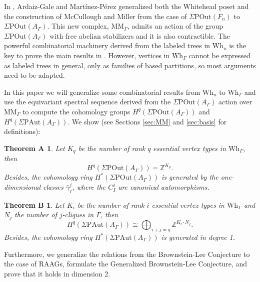 \documentclass[a4paper]{amsart}
\newcommand{\G}{\Gamma}
\newcommand{\A}{{A_\Gamma}}
\newcommand{\PAut}{\Sigma\mathrm{PAut}}
\newcommand{\POut}{\Sigma\mathrm{POut}}
\newcommand{\MM}{\mathrm{MM}}
\newcommand{\Wh}{\mathrm{Wh}}
\newtheorem*{teoA}{Theorem A}
\newtheorem*{teoB}{Theorem B}
\theoremstyle{definition}
\theoremstyle{remark}
\begin{document}
In \cite{ArMar}, Ardaiz-Gale and Martínez-Pérez generalized both the Whitehead poset and the construction of McCullough and Miller from the case of \( \POut(F_n) \) to \( \POut(\A) \). This new complex, $\MM_\G$, admits an  action of the group \( \POut(\A) \) with free abelian stabilizers and it  is also  contractible. The powerful combinatorial machinery derived from the labeled trees in $\Wh_n$ is the key to prove the main results in \cite{JMcCM}. However, vertices in $\Wh_\G$ cannot be expressed as labeled trees in general, only as families of based partitions, so most arguments need to be adapted. 


In this paper we will generalize some combinatorial results from $\Wh_n$ to $\Wh_\G$ and use the equivariant spectral sequence derived from the $\POut(\A)$ action over $\MM_\G$  to compute the cohomology groups $H^q(\POut(A_\G))$ and $H^q(\PAut(A_\G))$. We show (see Sections \ref{sec:MM} and \ref{sec:basis} for definitions):

\begin{teoA}
  Let $K_q$ be the number of rank $q$ essential vertex types in $\Wh_\G$, then
    $$
       H^q(\POut(A_\G))=\mathbb{Z}^{K_q}. 
    $$
    Besides, the cohomology ring $H^*(\POut(A_\G))$ is generated by the one-dimensional classes $\bar{\gamma}_I^j$, where  the $C_{I}^j$ are canonical automorphisms.   \label{teoA}
\end{teoA}


\begin{teoB} \label{teoB}
Let $K_i$ be the number of rank $i$ essential vertex types in $\Wh_\G$ and $N_j$ the number of $j$-cliques in $\G$, then
     $$
H^q(\PAut(A_\G))\cong \bigoplus_{i+j=q} \mathbb{Z}^{K_i\cdot N_j}.
    $$
     Besides, the cohomology ring $H^*(\PAut(A_\G))$ is generated in degree 1.
\end{teoB}

Furthermore, we generalize the relations from the Brownstein-Lee Conjecture to the case of RAAGs, formulate the Generalized Brownstein-Lee Conjecture, and prove that it holds in dimension 2.
\end{document}
